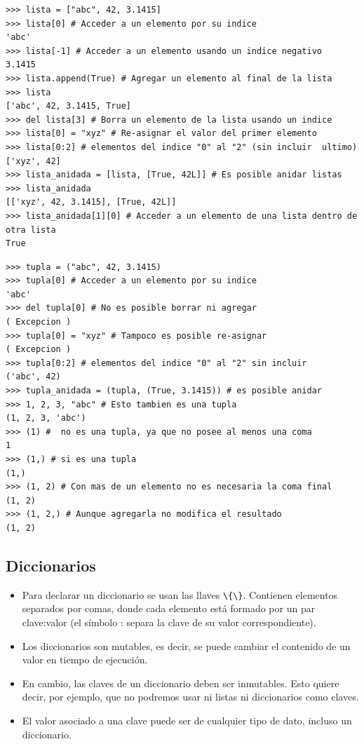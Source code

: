 \begin{lstlisting}
>>> lista = ["abc", 42, 3.1415]
>>> lista[0] # Acceder a un elemento por su indice
'abc'
>>> lista[-1] # Acceder a un elemento usando un indice negativo
3.1415
>>> lista.append(True) # Agregar un elemento al final de la lista
>>> lista
['abc', 42, 3.1415, True]
>>> del lista[3] # Borra un elemento de la lista usando un indice
>>> lista[0] = "xyz" # Re-asignar el valor del primer elemento
>>> lista[0:2] # elementos del indice "0" al "2" (sin incluir  ultimo)
['xyz', 42]
>>> lista_anidada = [lista, [True, 42L]] # Es posible anidar listas
>>> lista_anidada
[['xyz', 42, 3.1415], [True, 42L]]
>>> lista_anidada[1][0] # Acceder a un elemento de una lista dentro de otra lista
True
\end{lstlisting}

\begin{lstlisting}
>>> tupla = ("abc", 42, 3.1415)
>>> tupla[0] # Acceder a un elemento por su indice
'abc'
>>> del tupla[0] # No es posible borrar ni agregar
( Excepcion )
>>> tupla[0] = "xyz" # Tampoco es posible re-asignar
( Excepcion )
>>> tupla[0:2] # elementos del indice "0" al "2" sin incluir
('abc', 42)
>>> tupla_anidada = (tupla, (True, 3.1415)) # es posible anidar
>>> 1, 2, 3, "abc" # Esto tambien es una tupla
(1, 2, 3, 'abc')
>>> (1) #  no es una tupla, ya que no posee al menos una coma
1
>>> (1,) # si es una tupla
(1,)
>>> (1, 2) # Con mas de un elemento no es necesaria la coma final
(1, 2)
>>> (1, 2,) # Aunque agregarla no modifica el resultado
(1, 2)
\end{lstlisting}

\subsection{Diccionarios}
\begin{itemize}
\item    Para declarar un diccionario se usan las llaves \verb~\{\}~. Contienen elementos separados por comas, donde cada elemento está formado por un par clave:valor (el símbolo : separa la clave de su valor correspondiente).
 \item   Los diccionarios son mutables, es decir, se puede cambiar el contenido de un valor en tiempo de ejecución.
\item    En cambio, las claves de un diccionario deben ser inmutables. Esto quiere decir, por ejemplo, que no podremos usar ni listas ni diccionarios como claves.
\item    El valor asociado a una clave puede ser de cualquier tipo de dato, incluso un diccionario.

\end{itemize}






